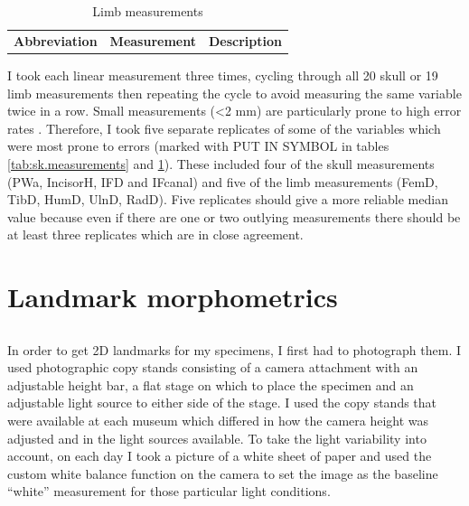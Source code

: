 \begin{table}[h]
\caption[Description of the limb measurements]
		{Limb measurements} %
\begin{tabular}{lll}
\textbf{Abbreviation} & \textbf{Measurement} & \textbf{Description}\\
\end{tabular}
\label{tab:limb.measurements}
\end{table}


I took each linear measurement three times, cycling through all 20 skull or 19 limb measurements then repeating the cycle to avoid measuring the same variable twice in a row. Small measurements (<2 mm) are particularly prone to high error rates \citep{Cardini2008}. Therefore, I took five separate replicates of some of the variables which were most prone to errors (marked with PUT IN SYMBOL in tables \ref{tab:sk.measurements} and \ref{tab:limb.measurements}). These included four of the skull measurements (PWa, IncisorH, IFD and IFcanal) and five of the limb measurements (FemD, TibD, HumD, UlnD, RadD). 
Five replicates should give a more reliable median value because even if there are one or two outlying measurements there should be at least three replicates which are in close agreement.

\section{Landmark morphometrics}
\subsection{}
In order to get 2D landmarks for my specimens, I first had to photograph them. I used photographic copy stands consisting of a camera attachment with an adjustable height bar, a flat stage on which to place the specimen and an adjustable light source to either side of the stage. I used the copy stands that were available at each museum which differed in how the camera height was adjusted and in the light sources available.
To take the light variability into account, on each day I took a picture of a white sheet of paper and used the custom white balance function on the camera to set the image as the baseline “white” measurement for those particular light conditions.

